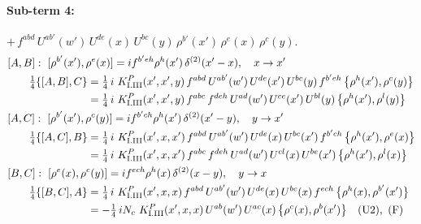 \documentclass[10pt]{article}
\numberwithin{equation}{section}
\begin{document}
\paragraph{Sub-term 4:} $+\,f^{abd}\,U^{ab'}(w')\,U^{de}(x)\,U^{bc}(y)\,\rho^{b'}(x')\,\rho^{e}(x)\,\rho^{c}(y)$.
\begin{align}
&[A,B]:\ [\rho^{b'}(x'),\rho^{e}(x)]=i f^{b'eh}\rho^{h}(x')\,\delta^{(2)}(x'-x),\quad x\to x'\notag\\
&\qquad \tfrac14\{[A,B],C\}=\tfrac14\,i\,\,K^{P}_{\rm I.III}(x',x',y)\,f^{abd}\,U^{ab'}(w')\,U^{de}(x')\,U^{bc}(y)\,f^{b'eh}\,\big\{\rho^{h}(x'),\rho^{c}(y)\big\}\notag\\
&\qquad\phantom{\tfrac14\{[A,B],C\}}=\tfrac14\,i\,\,K^{P}_{\rm I.III}(x',x',y)\,f^{abc}\,f^{deh}\,U^{ad}(w')\,U^{ce}(x')\,U^{bl}(y)\,\big\{\rho^{h}(x'),\rho^{l}(y)\big\}
\label{eq:GI.III.P-4-AB}\\
&[A,C]:\ [\rho^{b'}(x'),\rho^{c}(y)]=i f^{b'ch}\rho^{h}(x')\,\delta^{(2)}(x'-y),\quad y\to x'\notag\\
&\qquad \tfrac14\{[A,C],B\}=\tfrac14\,i\,\,K^{P}_{\rm I.III}(x',x,x')\,f^{abd}\,U^{ab'}(w')\,U^{de}(x)\,U^{bc}(x')\,f^{b'ch}\,\big\{\rho^{h}(x'),\rho^{e}(x)\big\}\notag\\
&\qquad\phantom{\tfrac14\{[A,C],B\}}=\tfrac14\,i\,\,K^{P}_{\rm I.III}(x',x,x')\,f^{abc}\,f^{deh}\,U^{ad}(w')\,U^{cl}(x)\,U^{be}(x')\,\big\{\rho^{h}(x'),\rho^{l}(x)\big\}
\label{eq:GI.III.P-4-AC}\\
&[B,C]:\ [\rho^{e}(x),\rho^{c}(y)]=i f^{ech}\rho^{h}(x)\,\delta^{(2)}(x-y),\quad y\to x\notag\\
&\qquad \tfrac14\{[B,C],A\}=\tfrac14\,i\,\,K^{P}_{\rm I.III}(x',x,x)\,f^{abd}\,U^{ab'}(w')\,U^{de}(x)\,U^{bc}(x)\,f^{ech}\,\big\{\rho^{h}(x),\rho^{b'}(x')\big\}\notag\\
&\qquad\phantom{\tfrac14\{[B,C],A\}}=-\tfrac14\,i N_{c}\,\,K^{P}_{\rm I.III}(x',x,x)\,U^{ab}(w')\,U^{ac}(x)\,\big\{\rho^{c}(x),\rho^{b}(x')\big\}\quad\text{(U2)},\ \text{(F)}
\label{eq:GI.III.P-4-BC}
\end{align}
\end{document}

